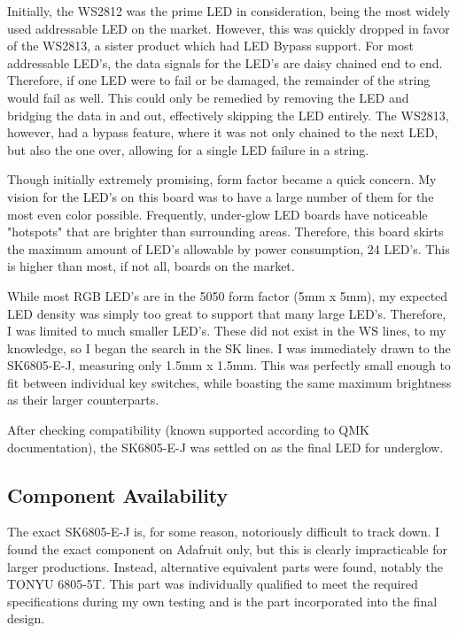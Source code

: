\documentclass[11pt]{article}
\begin{document}
Initially, the WS2812 was the prime LED in consideration, being the most widely used addressable LED on the market. However, this was quickly dropped in favor of the WS2813, a sister product which had LED Bypass support. For most addressable LED's, the data signals for the LED's are daisy chained end to end. Therefore, if one LED were to fail or be damaged, the remainder of the string would fail as well. This could only be remedied by removing the LED and bridging the data in and out, effectively skipping the LED entirely. The WS2813, however, had a bypass feature, where it was not only chained to the next LED, but also the one over, allowing for a single LED failure in a string. 

Though initially extremely promising, form factor became a quick concern. My vision for the LED's on this board was to have a large number of them for the most even color possible. Frequently, under-glow LED boards have noticeable "hotspots" that are brighter than surrounding areas. Therefore, this board skirts the maximum amount of LED's allowable by power consumption, 24 LED's. This is higher than most, if not all, boards on the market. 

While most RGB LED's are in the 5050 form factor (5mm x 5mm), my expected LED density was simply too great to support that many large LED's. Therefore, I was limited to much smaller LED's. These did not exist in the WS lines, to my knowledge, so I began the search in the SK lines. I was immediately drawn to the SK6805-E-J, measuring only 1.5mm x 1.5mm. This was perfectly small enough to fit between individual key switches, while boasting the same maximum brightness as their larger counterparts. 

After checking compatibility (known supported according to QMK documentation), the SK6805-E-J was settled on as the final LED for underglow. 

\subsection{Component Availability}

The exact SK6805-E-J is, for some reason, notoriously difficult to track down. I found the exact component on Adafruit only, but this is clearly impracticable for larger productions. Instead, alternative equivalent parts were found, notably the TONYU 6805-5T. This part was individually qualified to meet the required specifications during my own testing and is the part incorporated into the final design.
\end{document}

